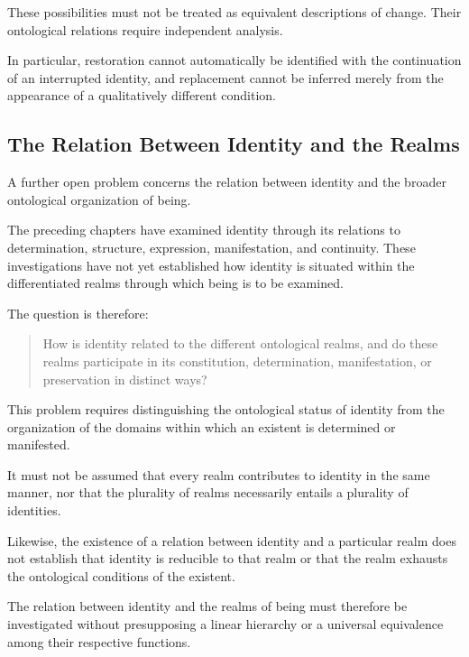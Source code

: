 These possibilities must not be treated as equivalent
descriptions of change. Their ontological relations
require independent analysis.

In particular, restoration cannot automatically be
identified with the continuation of an interrupted
identity, and replacement cannot be inferred merely
from the appearance of a qualitatively different
condition.


\subsection{The Relation Between Identity and the Realms}

A further open problem concerns the relation between
identity and the broader ontological organization of
being.

The preceding chapters have examined identity through
its relations to determination, structure, expression,
manifestation, and continuity. These investigations
have not yet established how identity is situated
within the differentiated realms through which being
is to be examined.

The question is therefore:

\begin{quote}
How is identity related to the different ontological
realms, and do these realms participate in its
constitution, determination, manifestation, or
preservation in distinct ways?
\end{quote}

This problem requires distinguishing the ontological
status of identity from the organization of the domains
within which an existent is determined or manifested.

It must not be assumed that every realm contributes
to identity in the same manner, nor that the plurality
of realms necessarily entails a plurality of identities.

Likewise, the existence of a relation between identity
and a particular realm does not establish that identity
is reducible to that realm or that the realm exhausts
the ontological conditions of the existent.

The relation between identity and the realms of being
must therefore be investigated without presupposing
a linear hierarchy or a universal equivalence among
their respective functions.

